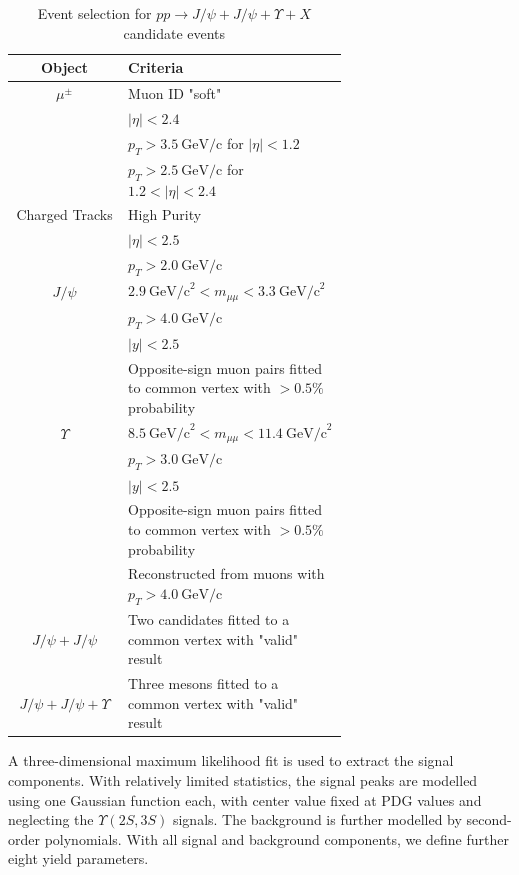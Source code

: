 \documentclass[10pt,twocolumn]{article}
\newcommand*{\GeVc}{~\text{GeV/c}}
\newcommand*{\GeVcs}{~\text{GeV/c}^2}
\begin{document}
\begin{table}[]
    \centering
    \caption{Event selection for $pp\to J/\psi+J/\psi+\Upsilon+X$ candidate events\\}
    \begin{tabular}{c p{0.66\linewidth}}
        \toprule
        \textbf{Object} & \textbf{Criteria} \\
        \midrule
        $\mu^\pm $ & Muon ID "soft" \\
                  & $|\eta| < 2.4$ \\
                  & $p_T > 3.5\GeVc$ for $|\eta| < 1.2$ \\
                  & $p_T > 2.5\GeVc$ for $1.2 < |\eta| < 2.4$ \\
                  \midrule
        Charged Tracks & High Purity \\
                  & $|\eta|<2.5$ \\
                  & $p_T > 2.0 \GeVc$ \\
        \midrule
        $J/\psi$ & $2.9 \GeVcs < m_{\mu\mu} < 3.3 \GeVcs$ \\
                 & $p_T > 4.0\GeVc$ \\
                 & $|y| < 2.5$ \\
                 & Opposite-sign muon pairs fitted to common vertex with $> 0.5\%$ probability \\
                 \midrule
        $\Upsilon$ & $8.5\GeVcs < m_{\mu\mu} < 11.4 \GeVcs$ \\
                 & $p_T > 3.0\GeVc$ \\
                 & $|y| < 2.5$ \\
                 & Opposite-sign muon pairs fitted to common vertex with $> 0.5\%$ probability \\
                 & Reconstructed from muons with $p_T>4.0\GeVc$ \\
                 \midrule
        $J/\psi+J/\psi$ & Two candidates fitted to a common vertex with "valid" result \\
        \midrule
        $J/\psi+J/\psi+\Upsilon$ & Three mesons fitted to a common vertex with "valid" result \\
        \bottomrule
    \end{tabular}
    \label{tab:cut_JpsiJpsiY}
\end{table}

A three-dimensional maximum likelihood fit is used to extract the signal components. With relatively limited statistics, the signal peaks are modelled using one Gaussian function each, with center value fixed at PDG values \cite{PDG2020} and neglecting the $\Upsilon(2S,3S)$ signals. The background is further modelled by second-order polynomials. With all signal and background components, we define further eight yield parameters.
\end{document}
